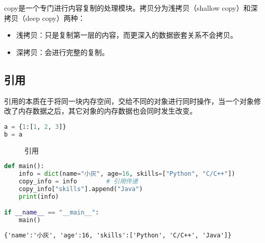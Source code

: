copy是一个专门进行内容复制的处理模块。拷贝分为浅拷贝（shallow copy）和深拷贝（deep copy）两种：

\begin{itemize}
	\item 浅拷贝：只是复制第一层的内容，而更深入的数据嵌套关系不会拷贝。
	\item 深拷贝：会进行完整的复制。
\end{itemize}

\vspace{0.5cm}

\subsection{引用}

引用的本质在于将同一块内存空间，交给不同的对象进行同时操作，当一个对象修改了内存数据之后，其它对象的内存数据也会同时发生改变。

\vspace{-0.5cm}

\begin{lstlisting}[language=Python]
a = {1:[1, 2, 3]}
b = a
\end{lstlisting}

\begin{figure}[H]
	\centering
	\caption{引用}
\end{figure}

\vspace{0.5cm}


\begin{lstlisting}[language=Python]
def main():
    info = dict(name="小灰", age=16, skills=["Python", "C/C++"])
    copy_info = info        # 引用传递
    copy_info["skills"].append("Java")
    print(info)

if __name__ == "__main__":
    main()
\end{lstlisting}

\begin{tcolorbox}
	\begin{verbatim}
{'name':'小灰', 'age':16, 'skills':['Python', 'C/C++', 'Java']}
\end{verbatim}
\end{tcolorbox}

